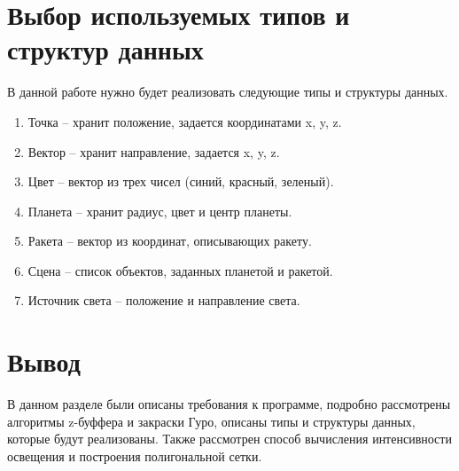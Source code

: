\section{Выбор используемых типов и структур данных}

В данной работе нужно будет реализовать следующие типы и структуры данных.

\begin{enumerate}
	\item Точка -- хранит положение, задается координатами x, y, z.
	\item Вектор -- хранит направление, задается x, y, z.
	\item Цвет -- вектор из трех чисел (синий, красный, зеленый).
	\item Планета -- хранит радиус, цвет и центр планеты.
	\item Ракета -- вектор из координат, описывающих ракету.
	\item Сцена -- список объектов, заданных планетой и ракетой.
	\item Источник света -- положение и направление света.
\end{enumerate}

\section{Вывод}

В данном разделе были описаны требования к программе, подробно рассмотрены алгоритмы z-буффера и закраски Гуро,
описаны типы и структуры данных, которые будут реализованы. Также рассмотрен способ вычисления интенсивности освещения и построения полигональной сетки.
